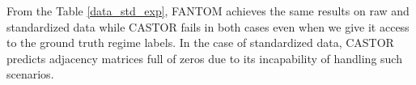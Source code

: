 From the Table \ref{data_std_exp}, FANTOM achieves the same results on raw and standardized data while CASTOR fails in both cases even when we give it access to the ground truth regime labels. In the case of standardized data, CASTOR predicts adjacency matrices full of zeros due to its incapability of handling such scenarios.